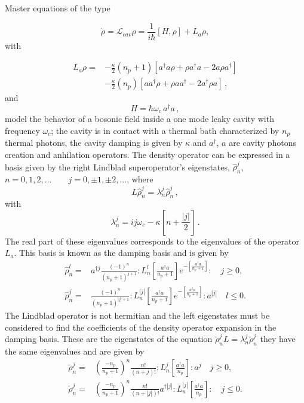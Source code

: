 \documentclass[reprint, amsmath,amssymb, aps,pra]{revtex4-1}
\begin{document}
Master equations of the type 

\begin{equation}
\dot{\rho} = \mathcal{L}_{cav} \rho = \frac{1}{i\hbar}[H,\rho]+L_a\rho, 
\end{equation} with

\begin{align}\label{EMField}
L_a \rho =& - \frac{\kappa}{2}(n_p+1)[a^\dagger a\rho + \rho a^\dagger a -2a\rho a^\dagger] \nonumber \\
 &- \frac{\kappa}{2}(n_p)[ aa^\dagger\rho + \rho  aa^\dagger -2a^\dagger\rho a]\, ,
\end{align}
and
\begin{equation}
  H=\hbar \omega_c \, a^\dagger a\, ,
\end{equation}
model the behavior of a bosonic field inside a one mode leaky cavity
with frequency $\omega_c$; the cavity is in contact with a thermal bath
characterized by $n_p$ thermal photons, the cavity damping is given by
$\kappa$ \cite{EnglertDB} and $a^\dagger$, $a$ are cavity photons
creation and anhilation operators. The density operator can be
expressed in a basis given by the right Lindblad superoperator's
eigenstates, ${\hat{\rho}_n^j}$,
$n=0,1,2,...\qquad j = 0,\pm 1, \pm 2,... $, where
\begin{equation}
L\hat{\rho}_n^j = \lambda_n^j\hat{\rho}_n^j\label{eq:eigen_damping}\, ,
\end{equation}
with
\begin{equation}
\lambda_n^j = ij\omega_c -\kappa[n + \frac{|j|}{2}]\, .
\end{equation}
The real part of these eigenvalues corresponds to the 
eigenvalues of the operator $L_a$. This basis is known as the damping
basis \cite{EnglertDB} and is given by
\begin{align}\label{DefDB}
\hat{\rho}_n^l=&a^{\dagger j}\frac{(-1)^n}{(n_p+1)^{j+1}}:L_n^l[\frac{a^\dagger a}{n_p+1}]e^{-[\frac{a^\dagger a}{n_p+1}]}:\quad j \geq 0, \\
\hat{\rho}_n^j=&\frac{(-1)^n}{(n_p+1)^{|j|+1}}:L_n^{|j|}[\frac{a^\dagger a}{n_p+1}]e^{-[\frac{a^\dagger a}{n_p+1}]}:a^{|j|}\quad l \leq 0.
\end{align}
The Lindblad operator is not hermitian and the left eigenstates must
be considered to find the coefficients of the density operator
expansion in the damping basis. These are the eigenstates of the
equation $\check{\rho}_n^jL = \lambda_n^j\check{\rho}_n^j$ they have
the same eigenvalues and are given by
\begin{align}\label{DefDBDual}
\check{\rho}_n^j=&(\frac{-n_p}{n_p+1})^n\frac{n!}{(n+j)!}:L_n^j[\frac{a^\dagger a}{n_p}]:a^{j}\quad j \geq 0, \\
\check{\rho}_n^j=&(\frac{-n_p}{n_p+1})^n\frac{n!}{(n+|j|)!}a^{\dagger|j|}:L_n^{|j|}[\frac{a^\dagger a}{n_p}]:\quad j \leq 0.
\end{align}
\end{document}
